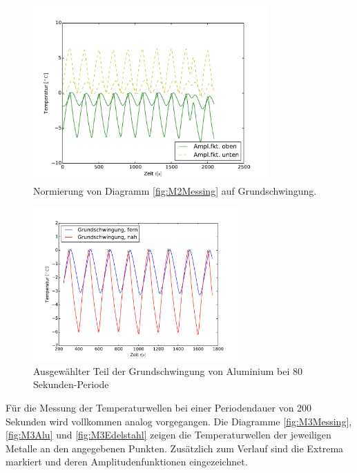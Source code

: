 \begin{figure}[h]
	\label{fig:M2AluNorm}
	\centering
	\includegraphics[width=0.8\textwidth]{Bilder/Normierungsauswahl/M2_Messing_norm.pdf}
	\caption{Normierung von Diagramm \ref{fig:M2Messing} auf Grundschwingung.}
\label{fig:M2AluNorm}
\end{figure}
\begin{figure}[h]
	\label{fig:M2AluNormkurve}
	\centering
	\includegraphics[width=0.7\textwidth]{Bilder/M2_Alu_norm.pdf}
	\caption{Ausgewählter Teil der Grundschwingung von Aluminium bei 80 Sekunden-Periode}
\end{figure}

Für die Messung der Temperaturwellen bei einer Periodendauer von 200 Sekunden wird vollkommen analog vorgegangen.
Die Diagramme \ref{fig:M3Messing}, \ref{fig:M3Alu} und \ref{fig:M3Edelstahl} zeigen die Temperaturwellen der jeweiligen Metalle an den angegebenen Punkten. 
Zusätzlich zum Verlauf sind die Extrema markiert und deren Amplitudenfunktionen eingezeichnet.

